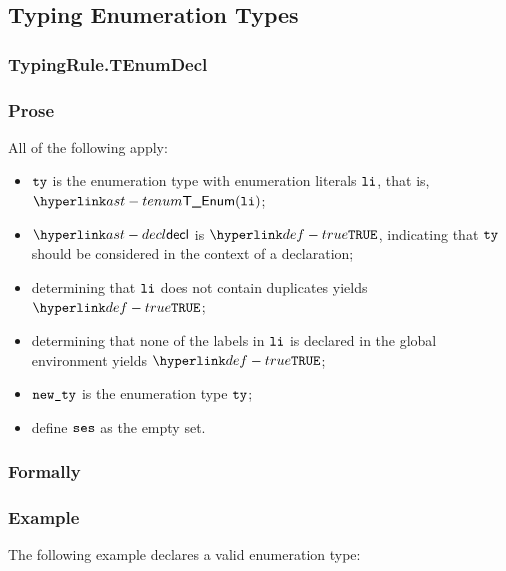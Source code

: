 \subsection{Typing Enumeration Types\label{sec:TypingEnumerationTypes}}
\subsubsection{TypingRule.TEnumDecl\label{sec:TypingRule.TEnumDecl}}

\subsubsection{Prose}
All of the following apply:
\begin{itemize}
  \item $\tty$ is the enumeration type with enumeration literals
    $\vli$, that is, $\TEnum(\vli)$;
  \item $\decl$ is $\True$, indicating that $\tty$ should be considered in the context of a declaration;
  \item determining that $\vli$ does not contain duplicates yields $\True$\ProseOrTypeError;
  \item determining that none of the labels in $\vli$ is declared in the global environment
  yields $\True$\ProseOrTypeError;
  \item $\newty$ is the enumeration type $\tty$;
  \item define $\vses$ as the empty set.
\end{itemize}
\subsubsection{Formally}
\begin{mathpar}

\end{mathpar}
\subsubsection{Example}
The following example declares a valid enumeration type:

